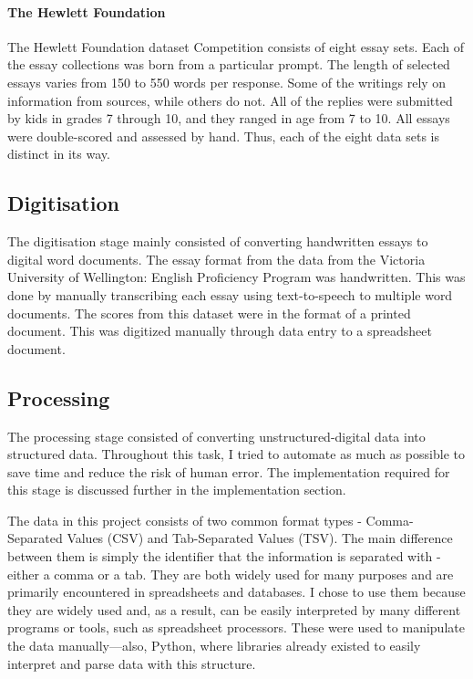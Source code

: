 \paragraph{The Hewlett Foundation}
The Hewlett Foundation dataset Competition consists of eight essay sets. Each of the essay collections was born from a particular prompt. The length of selected essays varies from 150 to 550 words per response. Some of the writings rely on information from sources, while others do not. All of the replies were submitted by kids in grades 7 through 10, and they ranged in age from 7 to 10. All essays were double-scored and assessed by hand. Thus, each of the eight data sets is distinct in its way. 
 
\subsection{Digitisation}
The digitisation stage mainly consisted of converting handwritten essays to digital word documents. The essay format from the data from the Victoria University of Wellington: English Proficiency Program was handwritten. This was done by manually transcribing each essay using text-to-speech to multiple word documents. The scores from this dataset were in the format of a printed document. This was digitized manually through data entry to a spreadsheet document.

\subsection{Processing}
The processing stage consisted of converting unstructured-digital data into structured data. Throughout this task, I tried to automate as much as possible to save time and reduce the risk of human error. The implementation required for this stage is discussed further in the implementation section.

The data in this project consists of two common format types - Comma-Separated Values (CSV) and Tab-Separated Values (TSV). The main difference between them is simply the identifier that the information is separated with - either a comma or a tab. They are both widely used for many purposes and are primarily encountered in spreadsheets and databases. I chose to use them because they are widely used and, as a result, can be easily interpreted by many different programs or tools, such as spreadsheet processors. These were used to manipulate the data manually—also, Python, where libraries already existed to easily interpret and parse data with this structure.

